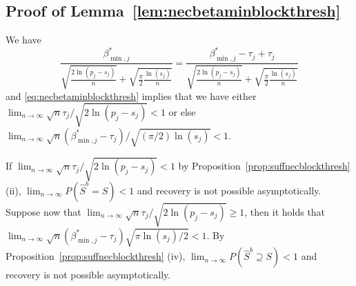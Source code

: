 \documentclass[bj,authoryear]{imsart}
\theoremstyle{plain}
\begin{document}
\subsection{Proof of Lemma~\ref{lem:necbetaminblockthresh}}
    We have $$\frac{\beta_{\min,j}^*}{\sqrt{\tfrac{2\ln(p_j-s_j)}{n}}+\sqrt{\tfrac{\pi}{2}\tfrac{\ln(s_j)}{n}}}= \frac{\beta_{\min,j}^*-\tau_j+\tau_j}{\sqrt{\tfrac{2\ln(p_j-s_j)}{n}}+\sqrt{\tfrac{\pi}{2}\tfrac{\ln(s_j)}{n}}}$$ and \eqref{eq:necbetaminblockthresh} implies that we have either $\lim_{n\to \infty}\sqrt{n}\tau_j/\sqrt{2\ln(p_j-s_j)} <1$ or else $\lim_{n\to \infty}\sqrt{n}(\beta_{\min,j}^*-\tau_j)/\sqrt{(\pi/2)\ln(s_j)} <1$. 
    
    If $\lim_{n\to \infty}\sqrt{n}\tau_j/\sqrt{2\ln(p_j-s_j)} <1$ by Proposition~\ref{prop:suffnecblockthresh} (ii), $\lim_{n \to \infty} P(\hat{S}^{b} = S) < 1$ and recovery is not possible asymptotically. 
    Suppose now that $\lim_{n\to \infty}\sqrt{n}\tau_j/\sqrt{2\ln(p_j-s_j)} \geq 1$, then it holds that $\lim_{n\to \infty}\sqrt{n}(\beta_{\min,j}^*-\tau_j)\sqrt{\pi\ln(s_j)/2} <1$. By Proposition~\ref{prop:suffnecblockthresh} (iv), $\lim_{n \to \infty} P(\hat{S}^{b} \supseteq S ) < 1$ and recovery is not possible asymptotically.
\end{document}
